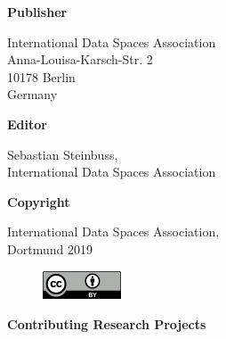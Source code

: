 
\vspace{\baselineskip}
\begin{multicols}{2}
\textbf{Publisher}\par

International Data Spaces Association\\
Anna-Louisa-Karsch-Str. 2\\
10178 Berlin\\
Germany\par

\textbf{Editor}\par

Sebastian Steinbuss, 
\\International Data Spaces Association\par

\textbf{Copyright}\par

International Data Spaces Association,\\
Dortmund 2019\par




\begin{figure}[H]
	\begin{Center}
		\includegraphics[width=0.92in,height=0.33in]{./media/image2.png}
		\label{fig:creativecommons}
	\end{Center}
\end{figure}



\par


\vspace{\baselineskip}

\vspace{\baselineskip}

\end{multicols}
 \textbf{Contributing Research Projects}\par





